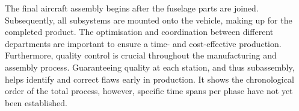 The final aircraft assembly begins after the fuselage parts are joined. 
Subsequently, all subsystems are mounted onto the vehicle, making up for the completed product. 
The optimisation and coordination between different departments are important to ensure a time- and cost-effective production.
Furthermore, quality control is crucial throughout the manufacturing and assembly process.
Guaranteeing quality at each station, and thus subassembly, helps identify and correct flaws early in production.
It shows the chronological order of the total process, however, specific time spans per phase have not yet been established.
